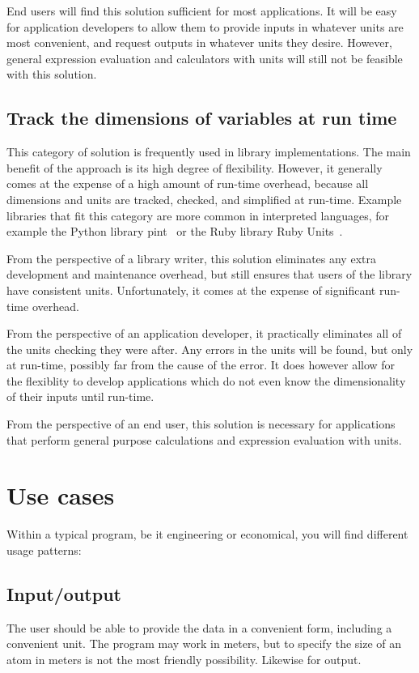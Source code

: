 \documentclass{article}
\begin{document}
End users will find this solution sufficient for most applications.
It will be easy for application developers to allow them to provide inputs in whatever units are most convenient,
and request outputs in whatever units they desire.
However, general expression evaluation and calculators with units will still not be feasible with this solution.

\subsection{Track the dimensions of variables at run time}
\label{dynamic-dimensions}

This category of solution is frequently used in library implementations.
The main benefit of the approach is its high degree of flexibility.
However, it generally comes at the expense of a high amount of run-time overhead,
because all dimensions and units are tracked, checked, and simplified at run-time.
Example libraries that fit this category are more common in interpreted languages,
for example the Python library pint~\cite{Grecco2021} or the Ruby library Ruby Units~\cite{Olbrich2021}.

From the perspective of a library writer, this solution eliminates any extra development and maintenance overhead,
but still ensures that users of the library have consistent units.
Unfortunately, it comes at the expense of significant run-time overhead.

From the perspective of an application developer, it practically eliminates all of the units checking they were after.
Any errors in the units will be found, but only at run-time, possibly far from the cause of the error.
It does however allow for the flexiblity to develop applications which do not even know the dimensionality of their inputs until run-time.

From the perspective of an end user, this solution is necessary for applications that perform general purpose calculations and expression evaluation with units.

\section{Use cases}
Within a typical program, be it engineering or economical, you will find different usage patterns:

\subsection*{Input/output}
The user should be able to provide the data in a convenient form, including a convenient unit. The program may work in meters,
but to specify the size of an atom in meters is not the most friendly possibility. Likewise for output.
\end{document}
